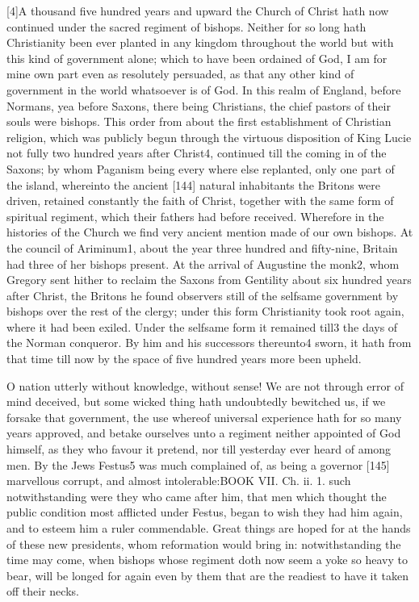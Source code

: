 [4]A thousand five hundred years and upward the Church of Christ hath now continued under the sacred regiment of bishops. Neither for so long hath Christianity been ever planted in any kingdom throughout the world but with this kind of government alone; which to have been ordained of God, I am for mine own part even as resolutely persuaded, as that any other kind of government in the world whatsoever is of God. In this realm of England, before Normans, yea before Saxons, there being Christians, the chief pastors of their souls were bishops. This order from about the first establishment of Christian religion, which was publicly begun through the virtuous disposition of King Lucie not fully two hundred years after Christ4, continued till the coming in of the Saxons; by whom Paganism being every where else replanted, only one part of the island, whereinto the ancient [144] natural inhabitants the Britons were driven, retained constantly the faith of Christ, together with the same form of spiritual regiment, which their fathers had before received. Wherefore in the histories of the Church we find very ancient mention made of our own bishops. At the council of Ariminum1, about the year three hundred and fifty-nine, Britain had three of her bishops present. At the arrival of Augustine the monk2, whom Gregory sent hither to reclaim the Saxons from Gentility about six hundred years after Christ, the Britons he found observers still of the selfsame government by bishops over the rest of the clergy; under this form Christianity took root again, where it had been exiled. Under the selfsame form it remained till3 the days of the Norman conqueror. By him and his successors thereunto4 sworn, it hath from that time till now by the space of five hundred years more been upheld.

O nation utterly without knowledge, without sense! We are not through error of mind deceived, but some wicked thing hath undoubtedly bewitched us, if we forsake that government, the use whereof universal experience hath for so many years approved, and betake ourselves unto a regiment neither appointed of God himself, as they who favour it pretend, nor till yesterday ever heard of among men. By the Jews Festus5 was much complained of, as being a governor [145] marvellous corrupt, and almost intolerable:BOOK VII. Ch. ii. 1. such notwithstanding were they who came after him, that men which thought the public condition most afflicted under Festus, began to wish they had him again, and to esteem him a ruler commendable. Great things are hoped for at the hands of these new presidents, whom reformation would bring in: notwithstanding the time may come, when bishops whose regiment doth now seem a yoke so heavy to bear, will be longed for again even by them that are the readiest to have it taken off their necks.

